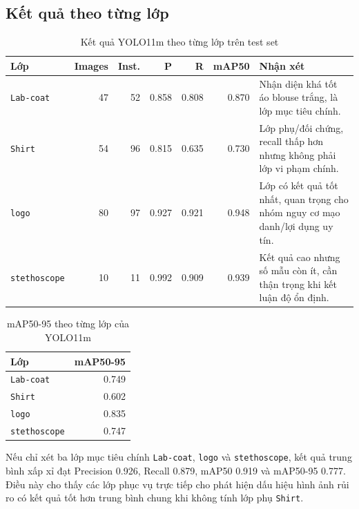 \subsection{Kết quả theo từng lớp}
\begin{table}[H]
\centering
\caption{Kết quả YOLO11m theo từng lớp trên test set}
\label{tab:yolo_class_metrics}
\begin{tabularx}{\textwidth}{|L{0.20\textwidth}|r|r|r|r|r|Y|}
\hline
\textbf{Lớp} & \textbf{Images} & \textbf{Inst.} & \textbf{P} & \textbf{R} & \textbf{mAP50} & \textbf{Nhận xét} \\
\hline
\texttt{Lab-coat} & 47 & 52 & 0.858 & 0.808 & 0.870 & Nhận diện khá tốt áo blouse trắng, là lớp mục tiêu chính. \\ \hline
\texttt{Shirt} & 54 & 96 & 0.815 & 0.635 & 0.730 & Lớp phụ/đối chứng, recall thấp hơn nhưng không phải lớp vi phạm chính. \\ \hline
\texttt{logo} & 80 & 97 & 0.927 & 0.921 & 0.948 & Lớp có kết quả tốt nhất, quan trọng cho nhóm nguy cơ mạo danh/lợi dụng uy tín. \\ \hline
\texttt{stethoscope} & 10 & 11 & 0.992 & 0.909 & 0.939 & Kết quả cao nhưng số mẫu còn ít, cần thận trọng khi kết luận độ ổn định. \\ \hline
\end{tabularx}
\end{table}

\begin{table}[H]
\centering
\caption{mAP50-95 theo từng lớp của YOLO11m}
\label{tab:yolo_map5095_by_class}
\begin{tabular}{|l|r|}
\hline
\textbf{Lớp} & \textbf{mAP50-95} \\
\hline
\texttt{Lab-coat} & 0.749 \\ \hline
\texttt{Shirt} & 0.602 \\ \hline
\texttt{logo} & 0.835 \\ \hline
\texttt{stethoscope} & 0.747 \\ \hline
\end{tabular}
\end{table}

Nếu chỉ xét ba lớp mục tiêu chính \texttt{Lab-coat}, \texttt{logo} và \texttt{stethoscope}, kết quả trung bình xấp xỉ đạt Precision 0.926, Recall 0.879, mAP50 0.919 và mAP50-95 0.777. Điều này cho thấy các lớp phục vụ trực tiếp cho phát hiện dấu hiệu hình ảnh rủi ro có kết quả tốt hơn trung bình chung khi không tính lớp phụ \texttt{Shirt}.

